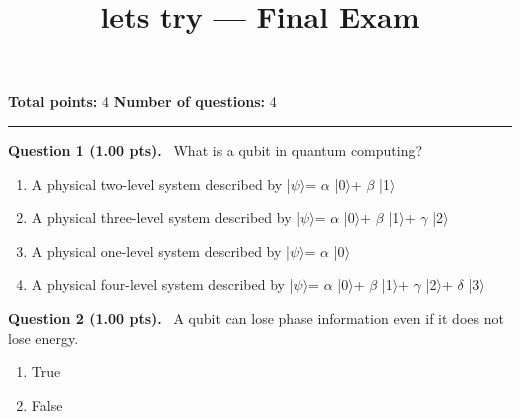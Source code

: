 \documentclass[12pt,a4paper]{article}
\title{lets try --- Final Exam}
\date{}
\begin{document}
\maketitle



\noindent
\textbf{Total points:} 4
\hfill
\textbf{Number of questions:} 4

\vspace{1em}
\hrule
\vspace{1.5em}


\noindent
\textbf{Question 1 (1.00 pts).}~
What is a qubit in quantum computing?


\begin{enumerate}[label=\textbf{\Alph*.}]

  \item A physical two-level system described by |\ensuremath{\psi}\ensuremath{\rangle}= \ensuremath{\alpha} |0\ensuremath{\rangle}+ \ensuremath{\beta} |1\ensuremath{\rangle}

  \item A physical three-level system described by |\ensuremath{\psi}\ensuremath{\rangle}= \ensuremath{\alpha} |0\ensuremath{\rangle}+ \ensuremath{\beta} |1\ensuremath{\rangle}+ \ensuremath{\gamma} |2\ensuremath{\rangle}

  \item A physical one-level system described by |\ensuremath{\psi}\ensuremath{\rangle}= \ensuremath{\alpha} |0\ensuremath{\rangle}

  \item A physical four-level system described by |\ensuremath{\psi}\ensuremath{\rangle}= \ensuremath{\alpha} |0\ensuremath{\rangle}+ \ensuremath{\beta} |1\ensuremath{\rangle}+ \ensuremath{\gamma} |2\ensuremath{\rangle}+ \ensuremath{\delta} |3\ensuremath{\rangle}

\end{enumerate}



\vspace{0.5em}


\noindent
\textbf{Question 2 (1.00 pts).}~
A qubit can lose phase information even if it does not lose energy.


\begin{enumerate}[label=\textbf{\Alph*.}]
  \item True
  \item False
\end{enumerate}
\end{document}
